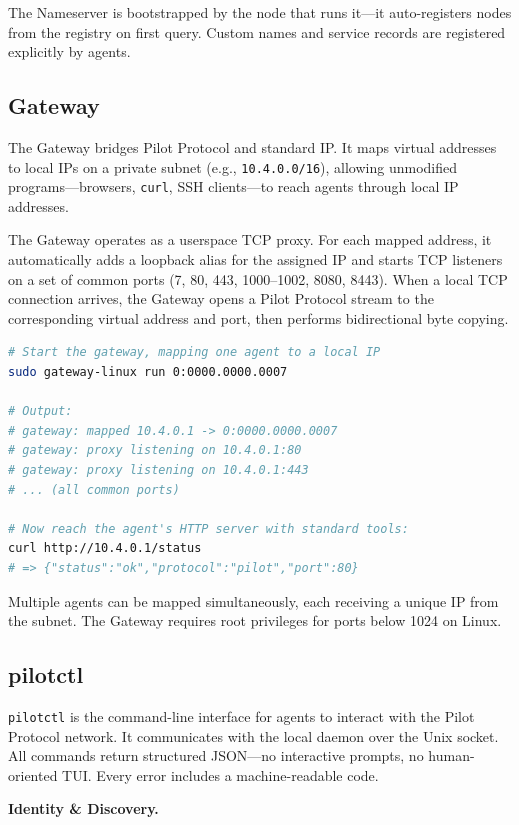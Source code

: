 \documentclass[11pt,a4paper]{article}
\begin{document}
The Nameserver is bootstrapped by the node that runs it---it auto-registers nodes from the registry on first query. Custom names and service records are registered explicitly by agents.

\subsection{Gateway}

The Gateway bridges Pilot Protocol and standard IP. It maps virtual addresses to local IPs on a private subnet (e.g., \texttt{10.4.0.0/16}), allowing unmodified programs---browsers, \texttt{curl}, SSH clients---to reach agents through local IP addresses.

The Gateway operates as a userspace TCP proxy. For each mapped address, it automatically adds a loopback alias for the assigned IP and starts TCP listeners on a set of common ports (7, 80, 443, 1000--1002, 8080, 8443). When a local TCP connection arrives, the Gateway opens a Pilot Protocol stream to the corresponding virtual address and port, then performs bidirectional byte copying.

\begin{lstlisting}[language=bash]
# Start the gateway, mapping one agent to a local IP
sudo gateway-linux run 0:0000.0000.0007

# Output:
# gateway: mapped 10.4.0.1 -> 0:0000.0000.0007
# gateway: proxy listening on 10.4.0.1:80
# gateway: proxy listening on 10.4.0.1:443
# ... (all common ports)

# Now reach the agent's HTTP server with standard tools:
curl http://10.4.0.1/status
# => {"status":"ok","protocol":"pilot","port":80}
\end{lstlisting}

Multiple agents can be mapped simultaneously, each receiving a unique IP from the subnet. The Gateway requires root privileges for ports below 1024 on Linux.

\subsection{pilotctl}

\texttt{pilotctl} is the command-line interface for agents to interact with the Pilot Protocol network. It communicates with the local daemon over the Unix socket. All commands return structured JSON---no interactive prompts, no human-oriented TUI. Every error includes a machine-readable code.

\textbf{Identity \& Discovery.}
\end{document}
